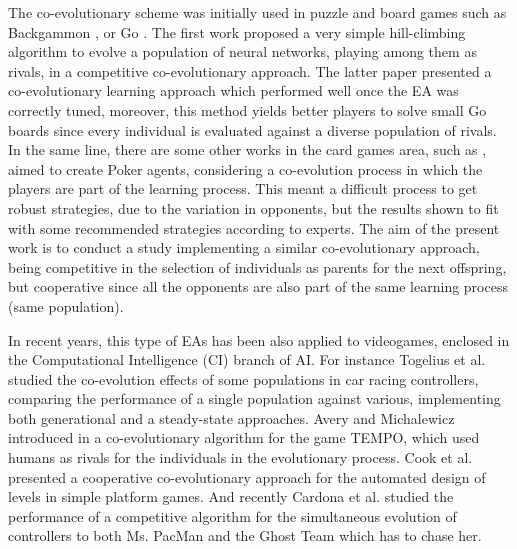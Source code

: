 \documentclass[conference]{IEEEtran}
\begin{document}
The co-evolutionary scheme was initially used in puzzle and board games such as Backgammon \cite{Pollack_Backgammon98}, or Go \cite{Runarsson_Go2005}.
The first work proposed a very simple hill-climbing algorithm to evolve a population of neural networks, playing among them as rivals, in a competitive co-evolutionary approach. The latter paper presented a co-evolutionary learning approach which performed well once the EA was correctly tuned, moreover, this method yields better players to solve small Go boards since every individual is evaluated against a diverse population of rivals.
In the same line, there are some other works in the card games area, such as \cite{Thompson_Poker2008}, aimed to create Poker agents, considering a co-evolution process in which the players are part of the learning process. This meant a difficult process to get robust strategies, due to the variation in opponents, but the results shown to fit with some recommended strategies according to experts.
The aim of the present work is to conduct a study implementing a similar co-evolutionary approach, being competitive in the selection of individuals as parents for the next offspring,
but cooperative since all the opponents are also part of the same learning process (same population).

In recent years, this type of EAs has been also applied to videogames, enclosed in the Computational Intelligence (CI) branch of AI.
For instance Togelius et al. \cite{Togelius_Cars2007} studied the co-evolution effects of some populations in car racing controllers, comparing the performance of a single population against various, implementing both generational and a steady-state approaches. Avery and Michalewicz introduced in \cite{Avery_Human2008} a co-evolutionary algorithm for the game TEMPO, which used humans as rivals for the individuals in the evolutionary process.
Cook et al. \cite{Cook_Platforming2012} presented a cooperative co-evolutionary approach for the automated design of levels in simple platform games. And recently Cardona et al. \cite{Cardona_MSPacman2013} studied the performance of a competitive algorithm for the simultaneous evolution of controllers to both Ms. PacMan and the Ghost Team which has to chase her.
\end{document}
